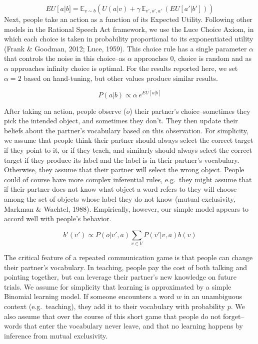 \documentclass[10pt, letterpaper]{article}
\begin{document}
\[
EU\left[a\right | b] = \mathbb{E}_{v \sim b} \left(U(a|v) + \gamma \,\mathbb{E}_{v',o',a'} \,\left( EU\left[a' | b'\right]\right)\right)
\] Next, people take an action as a function of its Expected Utility.
Following other models in the Rational Speech Act framework, we use the
Luce Choice Axiom, in which each choice is taken in probability
proportional to its exponentiated utility (Frank \& Goodman, 2012; Luce,
1959). This choice rule has a single parameter \(\alpha\) that controls
the noise in this choice--as \(\alpha\) approaches 0, choice is random
and as \(\alpha\) approaches infinity choice is optimal. For the results
reported here, we set \(\alpha = 2\) based on hand-tuning, but other
values produce similar results.

\[ 
P\left(a|b\right) \propto \alpha \, e^{EU[a|b]}
\]

After taking an action, people observe (\(o\)) their partner's
choice--sometimes they pick the intended object, and sometimes they
don't. They then update their beliefs about the partner's vocabulary
based on this observation. For simplicity, we assume that people think
their partner should always select the correct target if they point to
it, or if they teach, and similarly should always select the correct
target if they produce its label and the label is in their partner's
vocabulary. Otherwise, they assume that their partner will select the
wrong object. People could of course have more complex inferential
rules, e.g.~they might assume that if their partner does not know what
object a word refers to they will choose among the set of objects whose
label they do not know (mutual exclusivity, Markman \& Wachtel, 1988).
Empirically, however, our simple model appears to accord well with
people's behavior.

\[
b'(v') \propto P\left(o|v',a\right) \sum_{v \in V}P\left(v'|v,a\right)b\left(v\right)
\]

The critical feature of a repeated communication game is that people can
change their partner's vocabulary. In teaching, people pay the cost of
both talking and pointing together, but can leverage their partner's new
knowledge on future trials. We assume for simplicity that learning is
approximated by a simple Binomial learning model. If someone encounters
a word \(w\) in an unambiguous context (e.g.~teaching), they add it to
their vocabulary with probability \(p\). We also assume that over the
course of this short game that people do not forget--words that enter
the vocabulary never leave, and that no learning happens by inference
from mutual exclusivity.
\end{document}
